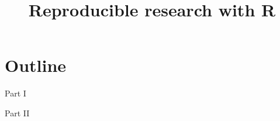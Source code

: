 \documentclass{beamer}
\title{Reproducible research with R \protect\\ 
       }
\begin{document}

\begin{frame}
    
    \titlepage
    
\end{frame}
    
    

\section*{Outline}

\begin{frame}{Part I}

    \tableofcontents[part=1]
        
\end{frame}

\begin{frame}{Part II}

    \tableofcontents[part=2]
        
\end{frame}







\end{document}
